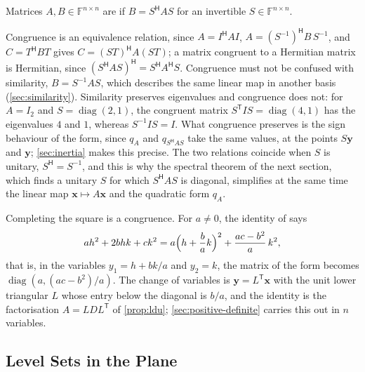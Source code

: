 \begin{definition}[Congruence]
\label{def:congruence}
Matrices $A,B\in\mathbb F^{n\times n}$ are  if $B=S^{\mathsf H}AS$ for an invertible $S\in\mathbb F^{n\times n}$.
\end{definition}

Congruence is an equivalence relation, since $A=I^{\mathsf H}AI$, $A=(S^{-1})^{\mathsf H}B\,S^{-1}$, and $C=T^{\mathsf H}BT$ gives $C=(ST)^{\mathsf H}A(ST)$; a matrix congruent to a Hermitian matrix is Hermitian, since $(S^{\mathsf H}AS)^{\mathsf H}=S^{\mathsf H}A^{\mathsf H}S$. Congruence must not be confused with similarity, $B=S^{-1}AS$, which describes the same linear map in another basis (\cref{sec:similarity}). Similarity preserves eigenvalues and congruence does not: for $A=I_2$ and $S=\operatorname{diag}(2,1)$, the congruent matrix $S^{\mathsf T}IS=\operatorname{diag}(4,1)$ has the eigenvalues $4$ and $1$, whereas $S^{-1}IS=I$. What congruence preserves is the sign behaviour of the form, since $q_A$ and $q_{S^{\mathsf H}AS}$ take the same values, at the points $S\mathbf y$ and $\mathbf y$; \cref{sec:inertia} makes this precise. The two relations coincide when $S$ is unitary, $S^{\mathsf H}=S^{-1}$, and this is why the spectral theorem of the next section, which finds a unitary $S$ for which $S^{\mathsf H}AS$ is diagonal, simplifies at the same time the linear map $\mathbf x\mapsto A\mathbf x$ and the quadratic form $q_A$.

Completing the square is a congruence. For $a\ne0$, the identity  of  says
\[
ah^2+2bhk+ck^2=a\Bigl(h+\frac bak\Bigr)^2+\frac{ac-b^2}a\,k^2 ,
\]
that is, in the variables $y_1=h+bk/a$ and $y_2=k$, the matrix of the form becomes $\operatorname{diag}(a,(ac-b^2)/a)$. The change of variables is $\mathbf y=L^{\mathsf T}\mathbf x$ with the unit lower triangular $L$ whose entry below the diagonal is $b/a$, and the identity is the factorisation $A=LDL^{\mathsf T}$ of \cref{prop:ldu}; \cref{sec:positive-definite} carries this out in $n$ variables.

\subsection{Level Sets in the Plane}

